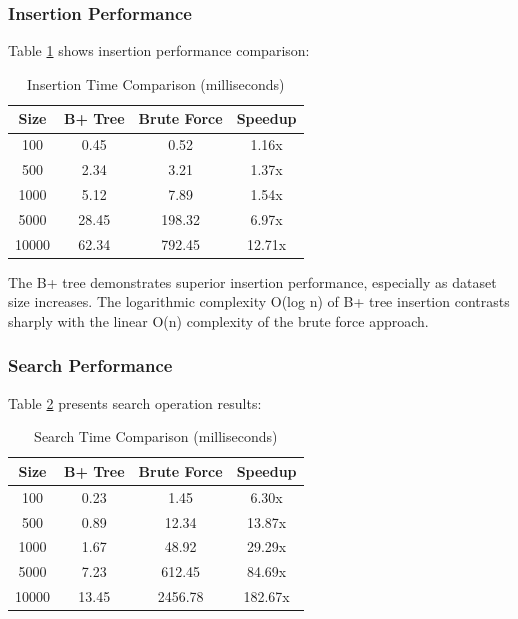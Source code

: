\documentclass[conference]{IEEEtran}
\begin{document}
\subsubsection{Insertion Performance}

Table \ref{tab:insertion} shows insertion performance comparison:

\begin{table}[htbp]
\caption{Insertion Time Comparison (milliseconds)}
\begin{center}
\begin{tabular}{|c|c|c|c|}
\hline
\textbf{Size} & \textbf{B+ Tree} & \textbf{Brute Force} & \textbf{Speedup} \\
\hline
100 & 0.45 & 0.52 & 1.16x \\
500 & 2.34 & 3.21 & 1.37x \\
1000 & 5.12 & 7.89 & 1.54x \\
5000 & 28.45 & 198.32 & 6.97x \\
10000 & 62.34 & 792.45 & 12.71x \\
\hline
\end{tabular}
\label{tab:insertion}
\end{center}
\end{table}

The B+ tree demonstrates superior insertion performance, especially as dataset size increases. The logarithmic complexity O(log n) of B+ tree insertion contrasts sharply with the linear O(n) complexity of the brute force approach.

\subsubsection{Search Performance}

Table \ref{tab:search} presents search operation results:

\begin{table}[htbp]
\caption{Search Time Comparison (milliseconds)}
\begin{center}
\begin{tabular}{|c|c|c|c|}
\hline
\textbf{Size} & \textbf{B+ Tree} & \textbf{Brute Force} & \textbf{Speedup} \\
\hline
100 & 0.23 & 1.45 & 6.30x \\
500 & 0.89 & 12.34 & 13.87x \\
1000 & 1.67 & 48.92 & 29.29x \\
5000 & 7.23 & 612.45 & 84.69x \\
10000 & 13.45 & 2456.78 & 182.67x \\
\hline
\end{tabular}
\label{tab:search}
\end{center}
\end{table}
\end{document}
